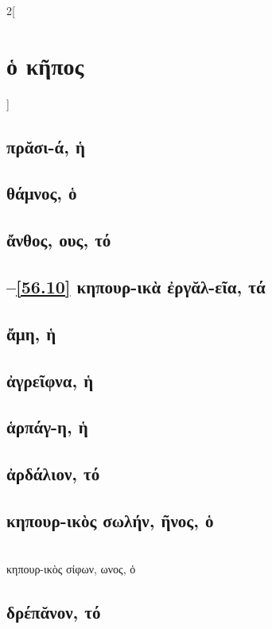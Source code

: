 \documentclass{book}
\begin{document}
\begin{multicols}{2}[\section{ὁ κῆπος}]
{\renewcommand \thesubsection {\thesection} }
\subsection{πρᾰσι-ά, ἡ}
\subsection{θάμνος, ὁ}
\subsection{ἄνθος, ους, τό}
\subsection{\protect\hspace{-2ex}--\ref{56.10} κηπουρ-ικὰ ἐργᾰλ-εῖα, τά}
 \setcounter{subsection}{4}
\subsection{ἄμη, ἡ}
\subsection{ἀγρεῖφνα, ἡ}
\subsection{ἁρπάγ-η, ἡ}
\subsection{ἀρδάλιον, τό}
\subsection{κηπουρ-ικὸς σωλήν, ῆνος, ὁ}
 ~\\
κηπουρ-ικὸς σίφων, ωνος, ὁ
\subsection{δρέπᾰνον, τό}
 \label{56.10}  

\end{multicols}
\end{document}
